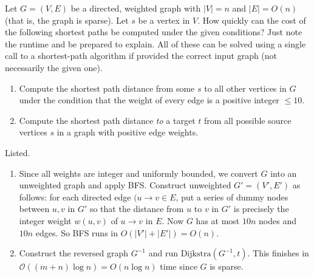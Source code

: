   \begin{exercise}
    Let  $G=(V, E)$ be a directed, weighted graph with $|V|= n$ and $|E|=O(n)$ (that is, the graph is sparse). Let $s$ be a vertex in $V$. How quickly can the cost of the following shortest paths be computed under the given conditions? Just note the runtime and be prepared to explain. All of these can be solved using a single call to a shortest-path algorithm if provided the correct input graph (not necessarily the given one).
    \begin{enumerate}
      \item Compute the shortest path distance from some $s$ to all other vertices in $G$ under the condition that the weight of every edge is a positive integer $\le  10$.
      \item Compute the shortest path distance \textit{to} a target $t$ from all possible source vertices $s$ in a graph with positive edge weights.
    \end{enumerate}
  \end{exercise}
  \begin{solution}
    Listed. 
    \begin{enumerate}
      \item Since all weights are integer and uniformly bounded, we convert $G$ into an unweighted graph and apply BFS. Construct unweighted $G'=(V', E')$ as follows: for each directed edge $(u\to v \in E$, put a series of dummy nodes between $u,v$ in $G'$ so that the distance from $u$ to $v$ in $G'$ is precisely the integer weight $w(u,v)$ of $u\to v$ in $E$. Now $G$ has at most $10n$ nodes and $10n$ edges. So BFS runs in $O(\lvert V'\rvert  + \lvert E'\rvert ) = O(n)$.
      \item Construct the reversed graph $G^{-1}$ and run $\mathrm{Dijkstra}(G^{-1}, t)$. This finishes in $\mathcal{O}((m+n) \log n) = O(n\log n)$ time since $G$ is sparse.
    \end{enumerate}
  \end{solution}

